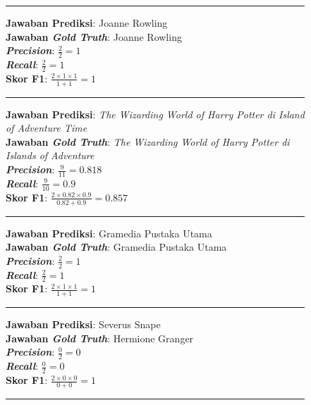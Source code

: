 \begin{figure}[h]
\vspace{3pt}
\hrule
\vspace{3pt}

\textbf{Jawaban Prediksi}: Joanne Rowling\\
\textbf{Jawaban \emph{Gold Truth}}: Joanne Rowling\\
\textbf{\emph{Precision}}: $\frac{2}{2}=1$\\
\textbf{\emph{Recall}}: $\frac{2}{2}=1$\\
\textbf{Skor F1}: $\frac{2 \times 1 \times 1}{1 + 1}=1$

\vspace{3pt}
\hrule
\vspace{3pt}

\textbf{Jawaban Prediksi}: \emph{The Wizarding World of Harry Potter di Island of Adventure Time}\\
\textbf{Jawaban \emph{Gold Truth}}: \emph{The Wizarding World of Harry Potter di Islands of Adventure}\\
\textbf{\emph{Precision}}: $\frac{9}{11}=0.818$\\
\textbf{\emph{Recall}}: $\frac{9}{10}=0.9$\\
\textbf{Skor F1}: $\frac{2 \times 0.82 \times 0.9}{0.82 + 0.9}=0.857$

\vspace{3pt}
\hrule
\vspace{3pt}

\textbf{Jawaban Prediksi}: Gramedia Pustaka Utama\\
\textbf{Jawaban \emph{Gold Truth}}: Gramedia Pustaka Utama\\
\textbf{\emph{Precision}}: $\frac{2}{2}=1$\\
\textbf{\emph{Recall}}: $\frac{2}{2}=1$\\
\textbf{Skor F1}: $\frac{2 \times 1 \times 1}{1 + 1}=1$

\vspace{5pt}
\hrule
\vspace{5pt}

\textbf{Jawaban Prediksi}: Severus Snape\\
\textbf{Jawaban \emph{Gold Truth}}: Hermione Granger\\
\textbf{\emph{Precision}}: $\frac{0}{2}=0$\\
\textbf{\emph{Recall}}: $\frac{0}{2}=0$\\
\textbf{Skor F1}: $\frac{2 \times 0 \times 0}{0 + 0}=1$

\vspace{3pt}
\hrule
\vspace{3pt}


\end{figure}
